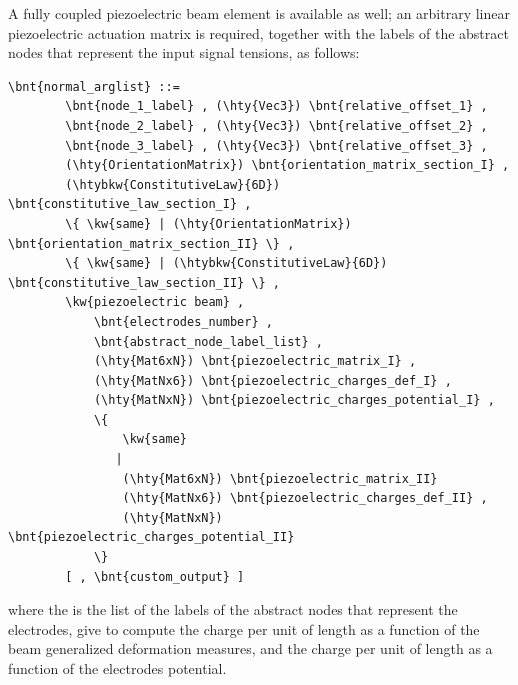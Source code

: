 A fully coupled piezoelectric beam element is available as well; an arbitrary
linear piezoelectric actuation matrix is required, together with the labels
of the abstract nodes that represent the input signal tensions, as follows:
\begin{Verbatim}[commandchars=\\\{\}]
    \bnt{normal_arglist} ::=
        \bnt{node_1_label} , (\hty{Vec3}) \bnt{relative_offset_1} ,
        \bnt{node_2_label} , (\hty{Vec3}) \bnt{relative_offset_2} ,
        \bnt{node_3_label} , (\hty{Vec3}) \bnt{relative_offset_3} ,
        (\hty{OrientationMatrix}) \bnt{orientation_matrix_section_I} ,
        (\htybkw{ConstitutiveLaw}{6D}) \bnt{constitutive_law_section_I} ,
        \{ \kw{same} | (\hty{OrientationMatrix}) \bnt{orientation_matrix_section_II} \} ,
        \{ \kw{same} | (\htybkw{ConstitutiveLaw}{6D}) \bnt{constitutive_law_section_II} \} ,
        \kw{piezoelectric beam} , 
            \bnt{electrodes_number} ,
            \bnt{abstract_node_label_list} ,
            (\hty{Mat6xN}) \bnt{piezoelectric_matrix_I} ,
            (\hty{MatNx6}) \bnt{piezoelectric_charges_def_I} ,
            (\hty{MatNxN}) \bnt{piezoelectric_charges_potential_I} ,
            \{ 
                \kw{same}
               |
                (\hty{Mat6xN}) \bnt{piezoelectric_matrix_II} 
                (\hty{MatNx6}) \bnt{piezoelectric_charges_def_II} ,
                (\hty{MatNxN}) \bnt{piezoelectric_charges_potential_II}
            \}
        [ , \bnt{custom_output} ]
\end{Verbatim}
where the  is the list of the labels of the
abstract nodes that represent the electrodes,  give
to compute the charge per unit of length as a function of the beam generalized
deformation measures, and  the charge per unit of length 
as a function of the electrodes potential.


